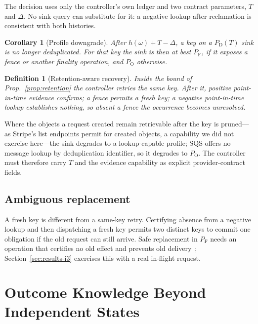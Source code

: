 \documentclass[conference,10pt]{IEEEtran}
\newtheorem{definition}{Definition}
\newtheorem{corollary}{Corollary}
\newcommand{\PDT}{P_{\mathrm{D}}(T)}
\newcommand{\PF}{P_{\mathrm{F}}}
\newcommand{\PO}{P_{\mathrm{O}}}
\begin{document}
The decision uses only the controller's own ledger and two contract parameters, $T$ and $\Delta$. No sink query can substitute for it: a negative lookup after reclamation is consistent with both histories.

\begin{corollary}[Profile downgrade]\label{cor:downgrade}
After $h(\omega)+T-\Delta$, a key on a $\PDT$ sink is no longer deduplicated. For that key the sink is then at best $\PF$, if it exposes a fence or another finality operation, and $\PO$ otherwise.
\end{corollary}
\begin{definition}[Retention-aware recovery]\label{def:aware}
Inside the bound of Prop.~\ref{prop:retention} the controller retries the same key. After it, positive point-in-time evidence confirms; a fence permits a fresh key; a negative point-in-time lookup establishes nothing, so absent a fence the occurrence becomes \emph{unresolved}.
\end{definition}

Where the objects a request created remain retrievable after the key is pruned---as Stripe's list endpoints permit for created objects, a capability we did not exercise here---the sink degrades to a lookup-capable profile; SQS offers no message lookup by deduplication identifier, so it degrades to $\PO$. The controller must therefore carry $T$ and the evidence capability as explicit provider-contract fields.

\subsection{Ambiguous replacement}
A fresh key is different from a same-key retry. Certifying absence from a negative lookup and then dispatching a fresh key permits two distinct keys to commit one obligation if the old request can still arrive. Safe replacement in $\PF$ needs an operation that certifies no old effect and prevents old delivery~\cite{aidguard}; Section~\ref{sec:results-i3} exercises this with a real in-flight request.

\section{Outcome Knowledge Beyond Independent States}\label{sec:belief}
\end{document}
